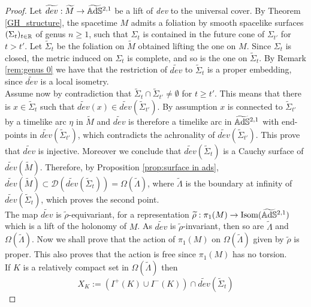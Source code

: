 \begin{proof}
    Let $\widetilde{dev}: \widetilde{M} \to \widetilde{\mathbb{A}\mathrm{d}\mathbb{S}}{}^{2,1}$ be a lift of \textit{dev} to the universal cover. By Theorem \ref{GH_structure}, the spacetime $M$ admits a foliation by smooth spacelike surfaces $(\Sigma_t)_{t\in\mathbb{R}}$ of genus $n\geq 1$, such that $\Sigma_t$ is contained in the future cone of $\Sigma_{t'}$ for $t > t'$. Let $\widetilde{\Sigma}_t$ be the foliation on $\widetilde{M}$ obtained lifting the one on $M$. Since $\Sigma_t$ is closed, the metric induced on $\Sigma_t$ is complete, and so is the one on $\widetilde{\Sigma}_t$. By Remark \ref{rem:genus 0} we have that the restriction of $\widetilde{dev}$ to $\widetilde{\Sigma}_t$ is a proper embedding, since $\widetilde{dev}$ is a local isometry.\\
    Assume now by contradiction that $\widetilde{\Sigma}_t \cap \widetilde{\Sigma}_{t'} \neq \emptyset$ for $t \geq t'$. This means that there is $x \in \widetilde{\Sigma}_t$ such that $\widetilde{dev}(x) \in \widetilde{dev}(\widetilde{\Sigma}_{t'})$. By assumption $x$ is connected to $\widetilde{\Sigma}_{t'}$ by a timelike arc $\eta$ in $\widetilde{M}$ and $\widetilde{dev}$ is therefore a timelike arc in $\widetilde{\mathbb{A}\mathrm{d}\mathbb{S}}{}^{2,1}$ with end-points in $\widetilde{dev}(\widetilde{\Sigma}_{t'})$, which contradicts the achronality of $\widetilde{dev}(\widetilde{\Sigma}_{t'})$. This prove that $\widetilde{dev}$ is injective. Moreover we conclude that $\widetilde{dev}(\widetilde{\Sigma}_t)$ is a Cauchy surface of $\widetilde{dev}(\widetilde{M})$. Therefore, by Proposition \ref{prop:surface in ads}, $\widetilde{dev}(\widetilde{M}) \subset \mathcal{D}(\widetilde{dev}(\widetilde{\Sigma}_t)) = \Omega(\widetilde{\Lambda})$, where $\widetilde{\Lambda}$ is the boundary at infinity of $\widetilde{dev}(\widetilde{\Sigma}_t)$, which proves the second point.\\
    The map $\widetilde{dev}$ is $\widetilde{\rho}$-equivariant, for a representation $\widetilde{\rho} : \pi_1(M) \to \text{Isom}(\widetilde{\mathbb{A}\mathrm{d}\mathbb{S}}{}^{2,1})$ which is a lift of the holonomy of $M$. As $\widetilde{dev}$ is $\widetilde{\rho}$-invariant, then so are $\widetilde{\Lambda}$ and $\Omega(\widetilde{\Lambda})$. Now we shall prove that the action of $\pi_1(M)$ on $\Omega(\widetilde{\Lambda})$ given by $\widetilde{\rho}$ is proper. This also proves that the action is free since $\pi_1(M)$ has no torsion.\\
    If $K$ is a relatively compact set in $\Omega(\widetilde{\Lambda})$ then
    \[
        X_K := (I^+(K) \cup I^-(K)) \cap \widetilde{dev}(\widetilde{\Sigma}_t)
\]
\end{proof}

